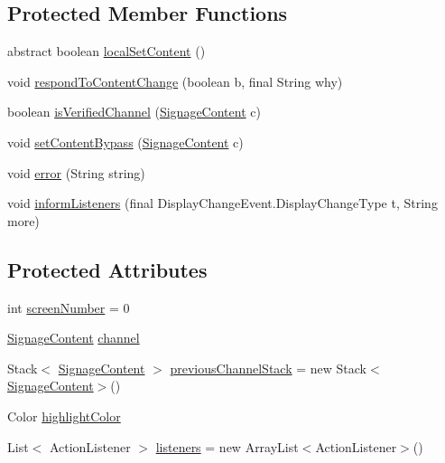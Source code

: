 \subsection*{Protected Member Functions}
\begin{DoxyCompactItemize}
\item 
abstract boolean \hyperlink{classgov_1_1fnal_1_1ppd_1_1dd_1_1display_1_1DisplayImpl_ad7d3f64a1788e1ba7887fc47028fb9c3}{local\-Set\-Content} ()
\item 
void \hyperlink{classgov_1_1fnal_1_1ppd_1_1dd_1_1display_1_1DisplayImpl_af28651f04a72d5fc629c14e3ceb87026}{respond\-To\-Content\-Change} (boolean b, final String why)
\item 
boolean \hyperlink{classgov_1_1fnal_1_1ppd_1_1dd_1_1display_1_1DisplayImpl_a1cd34d3710136494c4cfad17c29bc001}{is\-Verified\-Channel} (\hyperlink{interfacegov_1_1fnal_1_1ppd_1_1dd_1_1signage_1_1SignageContent}{Signage\-Content} c)
\item 
void \hyperlink{classgov_1_1fnal_1_1ppd_1_1dd_1_1display_1_1DisplayImpl_a4f5d156cebdc544eaa992153e5ccd137}{set\-Content\-Bypass} (\hyperlink{interfacegov_1_1fnal_1_1ppd_1_1dd_1_1signage_1_1SignageContent}{Signage\-Content} c)
\item 
void \hyperlink{classgov_1_1fnal_1_1ppd_1_1dd_1_1display_1_1DisplayImpl_ab240ed8a72e4006fb21eb6f30765f3df}{error} (String string)
\item 
void \hyperlink{classgov_1_1fnal_1_1ppd_1_1dd_1_1display_1_1DisplayImpl_a55d3593b3c95df466ddb7f5d59b2bfa2}{inform\-Listeners} (final Display\-Change\-Event.\-Display\-Change\-Type t, String more)
\end{DoxyCompactItemize}
\subsection*{Protected Attributes}
\begin{DoxyCompactItemize}
\item 
int \hyperlink{classgov_1_1fnal_1_1ppd_1_1dd_1_1display_1_1DisplayImpl_ace620614bde13cee492129c27f38db4e}{screen\-Number} = 0
\item 
\hyperlink{interfacegov_1_1fnal_1_1ppd_1_1dd_1_1signage_1_1SignageContent}{Signage\-Content} \hyperlink{classgov_1_1fnal_1_1ppd_1_1dd_1_1display_1_1DisplayImpl_a190a737d7c69248d533e0dc016dcd755}{channel}
\item 
Stack$<$ \hyperlink{interfacegov_1_1fnal_1_1ppd_1_1dd_1_1signage_1_1SignageContent}{Signage\-Content} $>$ \hyperlink{classgov_1_1fnal_1_1ppd_1_1dd_1_1display_1_1DisplayImpl_a1732d577755dfc58b9762a41599fa4ed}{previous\-Channel\-Stack} = new Stack$<$\hyperlink{interfacegov_1_1fnal_1_1ppd_1_1dd_1_1signage_1_1SignageContent}{Signage\-Content}$>$()
\item 
Color \hyperlink{classgov_1_1fnal_1_1ppd_1_1dd_1_1display_1_1DisplayImpl_af12ff2aa5231a9bb08e12b1dbd0dea7c}{highlight\-Color}
\item 
List$<$ Action\-Listener $>$ \hyperlink{classgov_1_1fnal_1_1ppd_1_1dd_1_1display_1_1DisplayImpl_aa4a7dad0a486d2f888cf47921423e2c1}{listeners} = new Array\-List$<$Action\-Listener$>$()
\end{DoxyCompactItemize}
